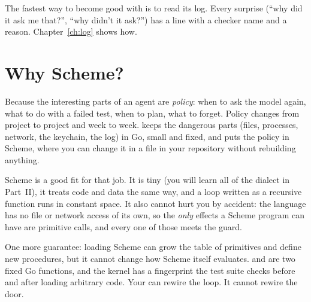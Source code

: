 \begin{tip}
The fastest way to become good with \nodwyn{} is to read its log. Every
surprise (``why did it ask me that?'', ``why didn't it ask?'') has a
 line with a checker name and a reason. Chapter~\ref{ch:log}
shows how.
\end{tip}

\section{Why Scheme?}

Because the interesting parts of an agent are \emph{policy}: when to ask the
model again, what to do with a failed test, when to plan, what to forget.
Policy changes from project to project and week to week. \nodwyn{} keeps the
dangerous parts (files, processes, network, the keychain, the log) in Go,
small and fixed, and puts the policy in Scheme, where you can change it in
a file in your repository without rebuilding anything.

Scheme is a good fit for that job. It is tiny (you will learn all of the
dialect in Part~II), it treats code and data the same way, and a loop
written as a recursive function runs in constant space. It also cannot hurt
you by accident: the language has no file or network access of its own, so
the \emph{only} effects a Scheme program can have are primitive calls, and
every one of those meets the guard.

One more guarantee: loading Scheme can grow the table of primitives and
define new procedures, but it cannot change how Scheme itself evaluates.
 and  are two fixed Go functions, and the kernel has
a fingerprint the test suite checks before and after loading arbitrary
code. Your  can rewire the loop. It cannot rewire the door.
